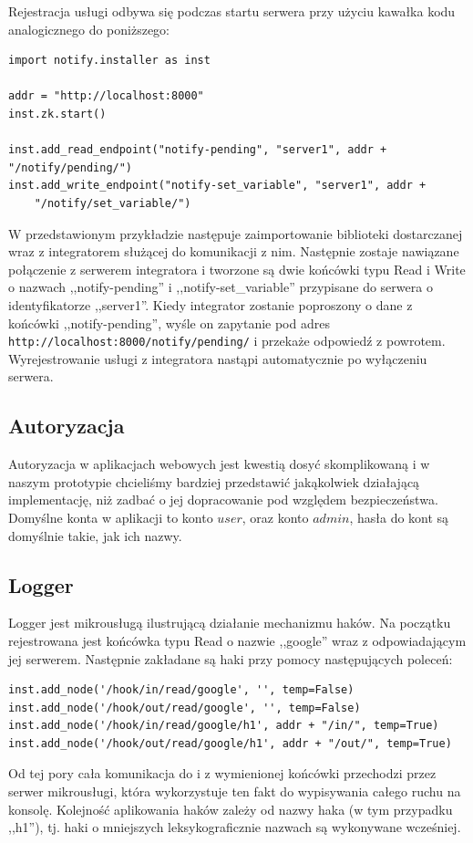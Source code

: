 \documentclass[licencjacka]{pracamgr}
\begin{document}
Rejestracja usługi odbywa się podczas startu serwera przy użyciu kawałka kodu
analogicznego do poniższego:

\begin{verbatim}
import notify.installer as inst

addr = "http://localhost:8000"
inst.zk.start()

inst.add_read_endpoint("notify-pending", "server1", addr + "/notify/pending/")
inst.add_write_endpoint("notify-set_variable", "server1", addr +
	"/notify/set_variable/")
\end{verbatim}
W przedstawionym przykładzie następuje zaimportowanie biblioteki dostarczanej wraz z
integratorem służącej do komunikacji z nim. Następnie zostaje nawiązane połączenie z
serwerem integratora i tworzone są dwie końcówki typu Read i Write o nazwach
,,notify-pending'' i ,,notify-set\_variable'' przypisane do serwera o identyfikatorze
,,server1''. Kiedy integrator zostanie poproszony o dane z końcówki ,,notify-pending'',
wyśle on zapytanie pod adres \texttt{http://localhost:8000/notify/pending/} i przekaże
odpowiedź z powrotem. Wyrejestrowanie usługi z integratora nastąpi automatycznie po
wyłączeniu serwera.

\subsection{Autoryzacja}
Autoryzacja w aplikacjach webowych jest kwestią dosyć skomplikowaną i w naszym prototypie chcieliśmy bardziej przedstawić jakąkolwiek działającą implementację, niż zadbać o jej dopracowanie pod względem bezpieczeństwa.
Domyślne konta w aplikacji to konto $user$, oraz konto $admin$, hasła do kont są domyślnie takie, jak ich nazwy.

\subsection{Logger}

Logger jest mikrousługą ilustrującą działanie mechanizmu haków. Na początku
rejestrowana jest końcówka typu Read o nazwie ,,google'' wraz z odpowiadającym
jej serwerem. Następnie zakładane są haki przy pomocy następujących poleceń:
\begin{verbatim}
inst.add_node('/hook/in/read/google', '', temp=False)
inst.add_node('/hook/out/read/google', '', temp=False)
inst.add_node('/hook/in/read/google/h1', addr + "/in/", temp=True)
inst.add_node('/hook/out/read/google/h1', addr + "/out/", temp=True)
\end{verbatim}
Od tej pory cała komunikacja do i z wymienionej końcówki przechodzi przez serwer
mikrousługi, która wykorzystuje ten fakt do wypisywania całego ruchu na konsolę.
Kolejność aplikowania haków zależy od nazwy haka (w tym przypadku ,,h1''), tj.
haki o mniejszych leksykograficznie nazwach są wykonywane wcześniej.
\end{document}

